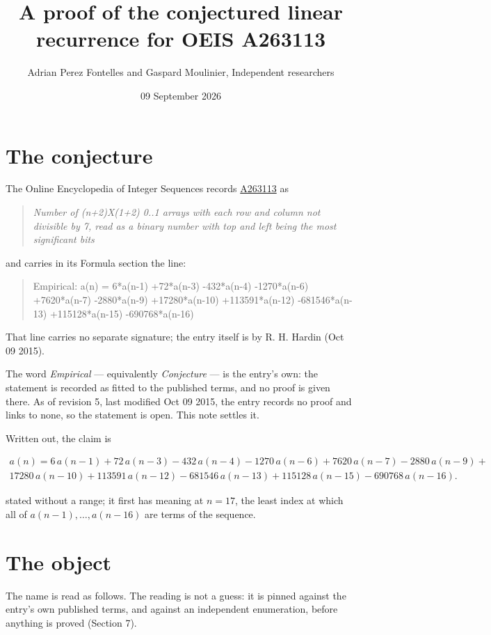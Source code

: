 \documentclass[11pt]{article}
\title{A proof of the conjectured linear recurrence for OEIS A263113}
\author{Adrian Perez Fontelles and Gaspard Moulinier, Independent researchers}
\date{09 September 2026}
\theoremstyle{definition}
\begin{document}
\maketitle
\section{The conjecture}

The Online Encyclopedia of Integer Sequences records \href{https://oeis.org/A263113}{A263113} as

\begin{quote}\itshape Number of (n+2)X(1+2) 0..1 arrays with each row and column not divisible by 7, read as a binary number with top and left being the most significant bits\end{quote}

and carries in its Formula section the line:

\begin{quote}\ttfamily Empirical: a(n) = 6*a(n-1) +72*a(n-3) -432*a(n-4) -1270*a(n-6) +7620*a(n-7) -2880*a(n-9) +17280*a(n-10) +113591*a(n-12) -681546*a(n-13) +115128*a(n-15) -690768*a(n-16)\end{quote}

That line carries no separate signature; the entry itself is by R. H. Hardin (Oct 09 2015).

The word {\itshape Empirical} --- equivalently {\itshape Conjecture} --- is the entry's own: the statement is recorded as fitted to the published terms, and no proof is given there. As of revision 5, last modified Oct 09 2015, the entry records no proof and links to none, so the statement is open. This note settles it.

Written out, the claim is

\begin{multline*} a(n) = 6\,a(n-1) + 72\,a(n-3) - 432\,a(n-4) - 1270\,a(n-6) + 7620\,a(n-7) - 2880\,a(n-9) + \\ 17280\,a(n-10) + 113591\,a(n-12) - 681546\,a(n-13) + 115128\,a(n-15) - 690768\,a(n-16). \end{multline*}

stated without a range; it first has meaning at $n = 17$, the least index at which all of $a(n-1),\dots,a(n-16)$ are terms of the sequence.

\section{The object}

The name is read as follows. The reading is not a guess: it is pinned against the entry's own published terms, and against an independent enumeration, before anything is proved (Section 7).
\end{document}
